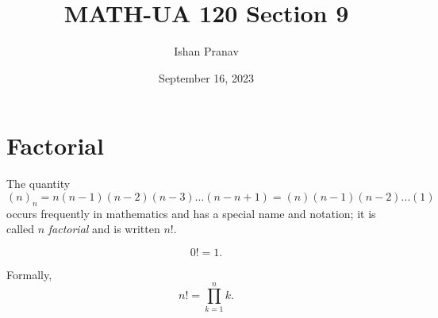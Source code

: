 \documentclass[12pt]{article}
\title{MATH-UA 120 Section 9}
\author{Ishan Pranav}
\date{September 16, 2023}
\begin{document}
\maketitle
\section*{Factorial}
The quantity
\[(n)_n=n(n-1)(n-2)(n-3)\dots(n-n+1)=(n)(n-1)(n-2)\dots(1)\]
occurs frequently in mathematics and has a special name and notation; it is called $n$ \textit{factorial} and is written $n!$.

\[0!=1.\]

Formally,
\[n!=\prod_{k=1}^{n}{k}.\]
\end{document}
